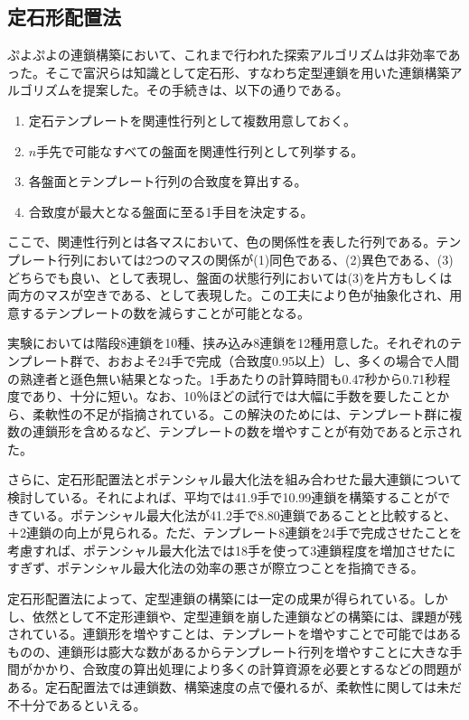 \documentclass[12pt]{jarticle}
\begin{document}
\subsection{定石形配置法}
ぷよぷよの連鎖構築において、これまで行われた探索アルゴリズムは非効率であった。そこで富沢ら\cite{puyo_temp}は知識として定石形、すなわち定型連鎖を用いた連鎖構築アルゴリズムを提案した。その手続きは、以下の通りである。
\begin{enumerate}
\item 定石テンプレートを関連性行列として複数用意しておく。
\item $n$手先で可能なすべての盤面を関連性行列として列挙する。
\item 各盤面とテンプレート行列の合致度を算出する。
\item 合致度が最大となる盤面に至る1手目を決定する。
\end{enumerate}

ここで、関連性行列とは各マスにおいて、色の関係性を表した行列である。テンプレート行列においては2つのマスの関係が(1)同色である、(2)異色である、(3)どちらでも良い、として表現し、盤面の状態行列においては(3)を片方もしくは両方のマスが空きである、として表現した。この工夫により色が抽象化され、用意するテンプレートの数を減らすことが可能となる。

実験においては階段8連鎖を10種、挟み込み8連鎖を12種用意した。それぞれのテンプレート群で、おおよそ24手で完成（合致度0.95以上）し、多くの場合で人間の熟達者と遜色無い結果となった。1手あたりの計算時間も0.47秒から0.71秒程度であり、十分に短い。なお、10％ほどの試行では大幅に手数を要したことから、柔軟性の不足が指摘されている。この解決のためには、テンプレート群に複数の連鎖形を含めるなど、テンプレートの数を増やすことが有効であると示された。

さらに、定石形配置法とポテンシャル最大化法を組み合わせた最大連鎖について検討している。それによれば、平均では41.9手で10.99連鎖を構築することができている。ポテンシャル最大化法が41.2手で8.80連鎖であることと比較すると、＋2連鎖の向上が見られる。ただ、テンプレート8連鎖を24手で完成させたことを考慮すれば、ポテンシャル最大化法では18手を使って3連鎖程度を増加させたにすぎず、ポテンシャル最大化法の効率の悪さが際立つことを指摘できる。

定石形配置法によって、定型連鎖の構築には一定の成果が得られている。しかし、依然として不定形連鎖や、定型連鎖を崩した連鎖などの構築には、課題が残されている。連鎖形を増やすことは、テンプレートを増やすことで可能ではあるものの、連鎖形は膨大な数があるからテンプレート行列を増やすことに大きな手間がかかり、合致度の算出処理により多くの計算資源を必要とするなどの問題がある。定石配置法では連鎖数、構築速度の点で優れるが、柔軟性に関しては未だ不十分であるといえる。
\end{document}
